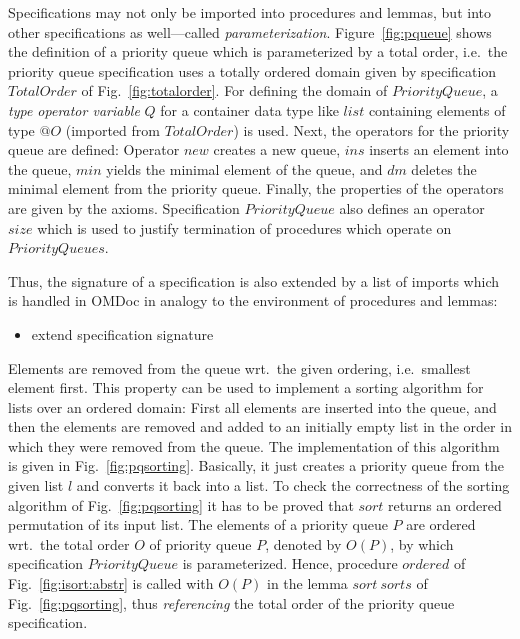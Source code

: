\documentclass{article}
\theoremstyle{remark}
\theoremstyle{definition}
\newcommand{\name}[1]{\mathit{#1}}
\begin{document}
Specifications may not only be imported into procedures and lemmas, but into other specifications as well---called
\emph{parameterization}. Figure~\ref{fig:pqueue} shows the definition of a priority queue which is parameterized by a
total order, i.e.\ the priority queue specification uses a totally ordered domain given by specification
$\name{TotalOrder}$ of Fig.~\ref{fig:totalorder}. For defining the domain of $\name{PriorityQueue}$, a \emph{type
operator variable} $Q$ for a container data type like $\name{list}$ containing elements of type $@O$ (imported from
$\name{TotalOrder}$) is used. Next, the operators for the priority queue are defined: Operator $\name{new}$ creates a
new queue, $\name{ins}$ inserts an element into the queue, $\name{min}$ yields the minimal element of the queue, and
$\name{dm}$ deletes the minimal element from the priority queue. Finally, the properties of the operators are given by
the axioms. Specification $\name{PriorityQueue}$ also defines an operator $\name{size}$ which is used to justify
termination of procedures which operate on $\name{PriorityQueues}$.

Thus, the signature of a specification is also extended by a list of imports which is handled in OMDoc in analogy to
the environment of procedures and lemmas:

\begin{itemize}
 \item extend specification signature
\end{itemize}

Elements are removed from the queue wrt.\ the given ordering, i.e.\ smallest element first. This property can be used
to implement a sorting algorithm for lists over an ordered domain: First all elements are inserted into the queue, and
then the elements are removed and added to an initially empty list in the order in which they were removed from the
queue. The implementation of this algorithm is given in Fig.~\ref{fig:pqsorting}. Basically, it just creates a priority
queue from the given list $l$ and converts it back into a list. To check the correctness of the sorting algorithm of
Fig.~\ref{fig:pqsorting} it has to be proved that $\name{sort}$ returns an ordered permutation of its input list. The
elements of a priority queue $P$ are ordered wrt.\ the total order $O$ of priority queue $P$, denoted by $O(P)$, by
which specification $\name{PriorityQueue}$ is parameterized. Hence, procedure $\name{ordered}$ of
Fig.~\ref{fig:isort:abstr} is called with $O(P)$ in the lemma $\name{sort}\ \name{sorts}$ of Fig.~\ref{fig:pqsorting},
thus \emph{referencing} the total order of the priority queue specification.
\end{document}
